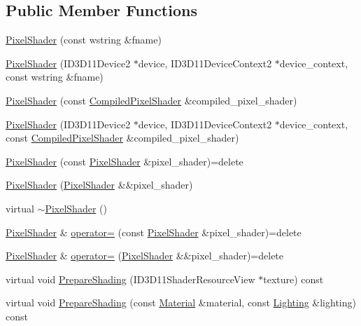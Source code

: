 \subsection*{Public Member Functions}
\begin{DoxyCompactItemize}
\item 
\hyperlink{classmage_1_1_pixel_shader_aceac0769412c88171ca85503165a85c0}{Pixel\+Shader} (const wstring \&fname)
\item 
\hyperlink{classmage_1_1_pixel_shader_a0e8952d69f42380d289e7b4bb8035b3e}{Pixel\+Shader} (I\+D3\+D11\+Device2 $\ast$device, I\+D3\+D11\+Device\+Context2 $\ast$device\+\_\+context, const wstring \&fname)
\item 
\hyperlink{classmage_1_1_pixel_shader_a1e283883bbdba3dbff22c0acda0b2473}{Pixel\+Shader} (const \hyperlink{structmage_1_1_compiled_pixel_shader}{Compiled\+Pixel\+Shader} \&compiled\+\_\+pixel\+\_\+shader)
\item 
\hyperlink{classmage_1_1_pixel_shader_a6d3bef6c6d0e2b20443eed92788646e2}{Pixel\+Shader} (I\+D3\+D11\+Device2 $\ast$device, I\+D3\+D11\+Device\+Context2 $\ast$device\+\_\+context, const \hyperlink{structmage_1_1_compiled_pixel_shader}{Compiled\+Pixel\+Shader} \&compiled\+\_\+pixel\+\_\+shader)
\item 
\hyperlink{classmage_1_1_pixel_shader_a361df943e40e9015ac4b769af130ce79}{Pixel\+Shader} (const \hyperlink{classmage_1_1_pixel_shader}{Pixel\+Shader} \&pixel\+\_\+shader)=delete
\item 
\hyperlink{classmage_1_1_pixel_shader_a5b2d7d36082d25c6f860674df745f7cd}{Pixel\+Shader} (\hyperlink{classmage_1_1_pixel_shader}{Pixel\+Shader} \&\&pixel\+\_\+shader)
\item 
virtual \hyperlink{classmage_1_1_pixel_shader_aac21a59d5d614f5bf1905f01479de44e}{$\sim$\+Pixel\+Shader} ()
\item 
\hyperlink{classmage_1_1_pixel_shader}{Pixel\+Shader} \& \hyperlink{classmage_1_1_pixel_shader_ac3a3535b2751237f4aad110dca05d0c3}{operator=} (const \hyperlink{classmage_1_1_pixel_shader}{Pixel\+Shader} \&pixel\+\_\+shader)=delete
\item 
\hyperlink{classmage_1_1_pixel_shader}{Pixel\+Shader} \& \hyperlink{classmage_1_1_pixel_shader_aaeab6f6fda7d6e1f7d333da03d58daf9}{operator=} (\hyperlink{classmage_1_1_pixel_shader}{Pixel\+Shader} \&\&pixel\+\_\+shader)=delete
\item 
virtual void \hyperlink{classmage_1_1_pixel_shader_ab677013145ca252c57e5a001134c01ff}{Prepare\+Shading} (I\+D3\+D11\+Shader\+Resource\+View $\ast$texture) const
\item 
virtual void \hyperlink{classmage_1_1_pixel_shader_a5a1a58bcb0ed64405e746ec7a5af5269}{Prepare\+Shading} (const \hyperlink{structmage_1_1_material}{Material} \&material, const \hyperlink{structmage_1_1_lighting}{Lighting} \&lighting) const
\end{DoxyCompactItemize}
